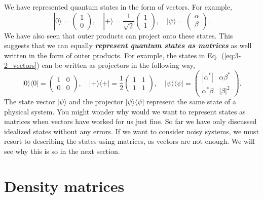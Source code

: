 We have represented quantum states in the form of vectors.
For example,
\begin{equation}
    |0\rangle = \begin{pmatrix} 1 \\ 0 \end{pmatrix}, \quad |+\rangle = \frac{1}{\sqrt{2}} \begin{pmatrix} 1 \\ 1 \end{pmatrix}, \quad |\psi\rangle = \begin{pmatrix} \alpha \\ \beta \end{pmatrix}.
    \label{eq:3-2_vectors}
\end{equation}
We have also seen that outer products can project onto these states.
This suggests that we can equally \textit{\textbf{represent quantum states as matrices}} as well written in the form of outer products.
For example, the states in Eq.~(\ref{eq:3-2_vectors}) can be written as projectors in the following way,
\begin{equation}
    |0\rangle\langle0| = \begin{pmatrix} 1 & 0 \\ 0 & 0 \end{pmatrix}, \quad |+\rangle\langle+| = \frac{1}{2} \begin{pmatrix} 1 & 1 \\ 1 & 1 \end{pmatrix}, \quad |\psi\rangle\langle\psi| = \begin{pmatrix} |\alpha^*| & \alpha\beta^* \\ \alpha^*\beta & |\beta|^2 \end{pmatrix}.
\end{equation}
The state vector $|\psi\rangle$ and the projector $|\psi\rangle\langle\psi|$ represent the same state of a physical system.
You might wonder why would we want to represent states as matrices when vectors have worked for us just fine.
So far we have only discussed idealized states without any errors.
If we want to consider noisy systems, we must resort to describing the states using matrices, as vectors are not enough.
We will see why this is so in the next section.



\section{Density matrices}
\label{sec:3-3_density_matrices}

